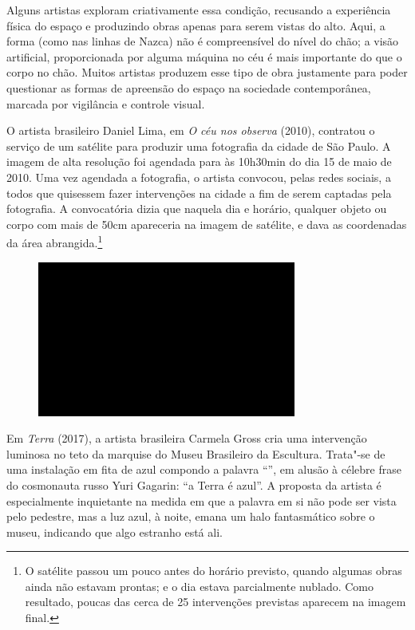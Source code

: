 Alguns artistas exploram criativamente essa condição, recusando a
experiência física do espaço e produzindo obras apenas para serem vistas
do alto. Aqui, a forma (como nas linhas de Nazca) não é compreensível do
nível do chão; a visão artificial, proporcionada por alguma máquina no
céu é mais importante do que o corpo no chão. Muitos artistas produzem
esse tipo de obra justamente para poder questionar as formas de
apreensão do espaço na sociedade contemporânea, marcada por vigilância e
controle visual.

O artista brasileiro Daniel Lima, em \emph{O céu nos observa} (2010),
contratou o serviço de um satélite para produzir uma fotografia da
cidade de São Paulo. A imagem de alta resolução foi agendada para às
10h30min do dia 15 de maio de 2010. Uma vez agendada a fotografia, o
artista convocou, pelas redes sociais, a todos que quisessem fazer
intervenções na cidade a fim de serem captadas pela fotografia. A
convocatória dizia que naquela dia e horário, qualquer objeto ou corpo
com mais de 50cm apareceria na imagem de satélite, e dava as
coordenadas da área abrangida.\footnote{O satélite passou um pouco antes
  do horário previsto, quando algumas obras ainda não estavam prontas; e
  o dia estava parcialmente nublado. Como resultado, poucas das cerca de
  25 intervenções previstas aparecem na imagem final.}

\begin{figure}[!ht]

\centering
 \includegraphics[width=85mm]{./imgs/im1.jpg}
\caption{\tiny{}}

\end{figure}

Em \emph{Terra} (2017), a artista brasileira Carmela Gross cria uma
intervenção luminosa no teto da marquise do Museu Brasileiro da
Escultura. Trata"-se de uma instalação em fita de  azul compondo a
palavra ``'', em alusão à célebre frase do cosmonauta russo Yuri
Gagarin: ``a Terra é azul''. A proposta da artista é especialmente
inquietante na medida em que a palavra em si não pode ser vista pelo
pedestre, mas a luz azul, à noite, emana um halo fantasmático sobre o
museu, indicando que algo estranho está ali.

